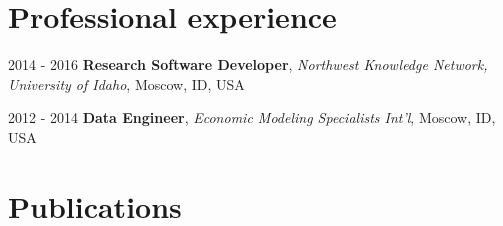 \documentclass[letterpaper,11pt,oneside]{article}
\begin{document}
\noindent
\section*{\textcolor{gunmetal}{Professional experience}}

  \begin{hangparas}{0.25in}{1}
    2014 - 2016 \hspace{-0.555em} \quad\textbf{Research Software Developer}, 
        \emph{Northwest Knowledge Network, University of Idaho}, Moscow, ID, USA 

      2012 - 2014 \quad \textbf{Data Engineer}, 
      \emph{Economic Modeling Specialists Int'l}, Moscow, ID, USA 
  \end{hangparas}

\noindent


\noindent
\section*{\textcolor{gunmetal}{Publications}}
\end{document}
